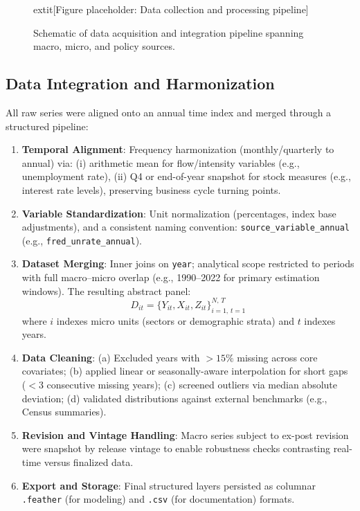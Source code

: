 \begin{figure}[htbp]
  \centering
  	extit{[Figure placeholder: Data collection and processing pipeline]} 
  \caption{Schematic of data acquisition and integration pipeline spanning macro, micro, and policy sources.}\label{fig:data_pipeline}
\end{figure}

\subsection{Data Integration and Harmonization}\label{subsec:data_processing}
All raw series were aligned onto an annual time index and merged through a structured pipeline:
\begin{enumerate}
  \item \textbf{Temporal Alignment}: Frequency harmonization (monthly/quarterly to annual) via: (i) arithmetic mean for flow/intensity variables (e.g., unemployment rate), (ii) Q4 or end-of-year snapshot for stock measures (e.g., interest rate levels), preserving business cycle turning points.
  \item \textbf{Variable Standardization}: Unit normalization (percentages, index base adjustments), and a consistent naming convention: \texttt{source\_variable\_annual} (e.g., \texttt{fred\_unrate\_annual}).
  \item \textbf{Dataset Merging}: Inner joins on \texttt{year}; analytical scope restricted to periods with full macro--micro overlap (e.g., 1990--2022 for primary estimation windows). The resulting abstract panel: 
  \begin{equation*}
    D_{it} = \{ Y_{it}, X_{it}, Z_{it} \}_{i=1,\,t=1}^{N,\,T}
  \end{equation*}
  where $i$ indexes micro units (sectors or demographic strata) and $t$ indexes years.
  \item \textbf{Data Cleaning}: (a) Excluded years with $>15\%$ missing across core covariates; (b) applied linear or seasonally-aware interpolation for short gaps ($<3$ consecutive missing years); (c) screened outliers via median absolute deviation; (d) validated distributions against external benchmarks (e.g., Census summaries).
  \item \textbf{Revision and Vintage Handling}: Macro series subject to ex-post revision were snapshot by release vintage to enable robustness checks contrasting real-time versus finalized data.
  \item \textbf{Export and Storage}: Final structured layers persisted as columnar \texttt{.feather} (for modeling) and \texttt{.csv} (for documentation) formats.
\end{enumerate}

